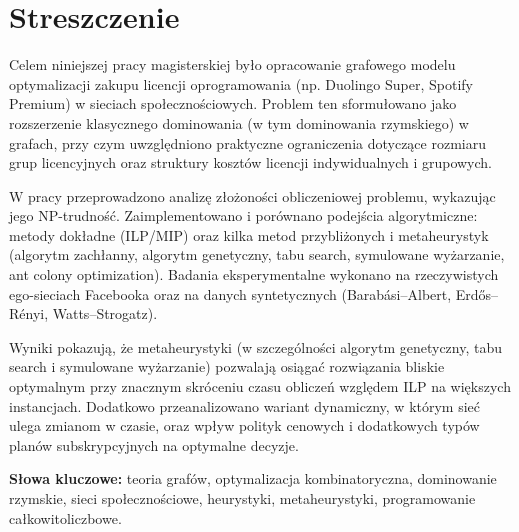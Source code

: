 \section*{Streszczenie}

Celem niniejszej pracy magisterskiej było opracowanie grafowego modelu optymalizacji zakupu licencji oprogramowania (np. Duolingo Super, Spotify Premium) w sieciach społecznościowych. Problem ten sformułowano jako rozszerzenie klasycznego dominowania (w tym dominowania rzymskiego) w grafach, przy czym uwzględniono praktyczne ograniczenia dotyczące rozmiaru grup licencyjnych oraz struktury kosztów licencji indywidualnych i grupowych.

W pracy przeprowadzono analizę złożoności obliczeniowej problemu, wykazując jego NP-trudność. Zaimplementowano i porównano podejścia algorytmiczne: metody dokładne (ILP/MIP) oraz kilka metod przybliżonych i metaheurystyk (algorytm zachłanny, algorytm genetyczny, tabu search, symulowane wyżarzanie, ant colony optimization). Badania eksperymentalne wykonano na rzeczywistych ego-sieciach Facebooka oraz na danych syntetycznych (Barabási–Albert, Erdős–Rényi, Watts–Strogatz).

Wyniki pokazują, że metaheurystyki (w szczególności algorytm genetyczny, tabu search i symulowane wyżarzanie) pozwalają osiągać rozwiązania bliskie optymalnym przy znacznym skróceniu czasu obliczeń względem ILP na większych instancjach. Dodatkowo przeanalizowano wariant dynamiczny, w którym sieć ulega zmianom w czasie, oraz wpływ polityk cenowych i dodatkowych typów planów subskrypcyjnych na optymalne decyzje.

\textbf{Słowa kluczowe:} teoria grafów, optymalizacja kombinatoryczna, dominowanie rzymskie, sieci społecznościowe, heurystyki, metaheurystyki, programowanie całkowitoliczbowe.
